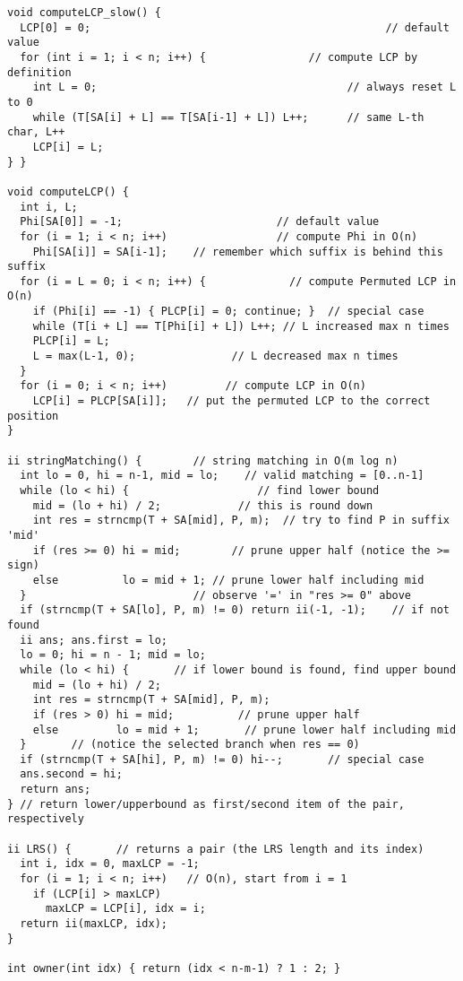 \documentclass[10pt,landscape]{article}
\begin{document}
\begin{multicols}{2}
\begin{lstlisting}
void computeLCP_slow() {
  LCP[0] = 0;                                              // default value
  for (int i = 1; i < n; i++) {                // compute LCP by definition
    int L = 0;                                       // always reset L to 0
    while (T[SA[i] + L] == T[SA[i-1] + L]) L++;      // same L-th char, L++
    LCP[i] = L;
} }

void computeLCP() {
  int i, L;
  Phi[SA[0]] = -1;                        // default value
  for (i = 1; i < n; i++)                 // compute Phi in O(n)
    Phi[SA[i]] = SA[i-1];    // remember which suffix is behind this suffix
  for (i = L = 0; i < n; i++) {             // compute Permuted LCP in O(n)
    if (Phi[i] == -1) { PLCP[i] = 0; continue; }  // special case
    while (T[i + L] == T[Phi[i] + L]) L++; // L increased max n times
    PLCP[i] = L;
    L = max(L-1, 0);               // L decreased max n times
  }
  for (i = 0; i < n; i++)         // compute LCP in O(n)
    LCP[i] = PLCP[SA[i]];   // put the permuted LCP to the correct position
}

ii stringMatching() {        // string matching in O(m log n)
  int lo = 0, hi = n-1, mid = lo;    // valid matching = [0..n-1]
  while (lo < hi) {                    // find lower bound
    mid = (lo + hi) / 2;            // this is round down
    int res = strncmp(T + SA[mid], P, m);  // try to find P in suffix 'mid'
    if (res >= 0) hi = mid;        // prune upper half (notice the >= sign)
    else          lo = mid + 1; // prune lower half including mid
  }                          // observe '=' in "res >= 0" above
  if (strncmp(T + SA[lo], P, m) != 0) return ii(-1, -1);    // if not found
  ii ans; ans.first = lo;
  lo = 0; hi = n - 1; mid = lo;
  while (lo < hi) {       // if lower bound is found, find upper bound
    mid = (lo + hi) / 2;
    int res = strncmp(T + SA[mid], P, m);
    if (res > 0) hi = mid;          // prune upper half
    else         lo = mid + 1;       // prune lower half including mid
  }       // (notice the selected branch when res == 0)
  if (strncmp(T + SA[hi], P, m) != 0) hi--;       // special case
  ans.second = hi;
  return ans;
} // return lower/upperbound as first/second item of the pair, respectively

ii LRS() {       // returns a pair (the LRS length and its index)
  int i, idx = 0, maxLCP = -1;
  for (i = 1; i < n; i++)   // O(n), start from i = 1
    if (LCP[i] > maxLCP)
      maxLCP = LCP[i], idx = i;
  return ii(maxLCP, idx);
}

int owner(int idx) { return (idx < n-m-1) ? 1 : 2; }


\end{lstlisting}
\end{multicols}
\end{document}
